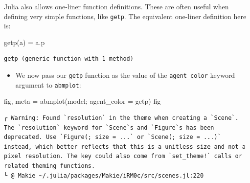 \documentclass[
  letterpaper,
  DIV=11,
  numbers=noendperiod]{scrartcl}
\newenvironment{Shaded}{\begin{snugshade}}{\end{snugshade}}
\newcommand{\FunctionTok}[1]{\textcolor[rgb]{0.28,0.35,0.67}{#1}}
\newcommand{\NormalTok}[1]{\textcolor[rgb]{0.00,0.23,0.31}{#1}}
\newcommand{\OperatorTok}[1]{\textcolor[rgb]{0.37,0.37,0.37}{#1}}
\providecommand{\tightlist}{%
  \setlength{\itemsep}{0pt}\setlength{\parskip}{0pt}}\usepackage{longtable,booktabs,array}
\begin{document}
\begin{tcolorbox}[enhanced jigsaw, breakable, title=\textcolor{quarto-callout-tip-color}{\faLightbulb}\hspace{0.5em}{Tip}, bottomrule=.15mm, coltitle=black, toprule=.15mm, titlerule=0mm, colframe=quarto-callout-tip-color-frame, toptitle=1mm, opacityback=0, colbacktitle=quarto-callout-tip-color!10!white, rightrule=.15mm, bottomtitle=1mm, arc=.35mm, leftrule=.75mm, opacitybacktitle=0.6, colback=white, left=2mm]

Julia also allows one-liner function definitions. These are often useful
when defining very simple functions, like \texttt{getp}. The equivalent
one-liner definition here is:

\begin{Shaded}
\begin{Highlighting}[]
\FunctionTok{getp}\NormalTok{(a) }\OperatorTok{=}\NormalTok{ a.p}
\end{Highlighting}
\end{Shaded}

\begin{verbatim}
getp (generic function with 1 method)
\end{verbatim}

\end{tcolorbox}

\begin{itemize}
\tightlist
\item
  We now pass our \texttt{getp} function as the value of the
  \texttt{agent\_color} keyword argument to \texttt{abmplot}:
\end{itemize}

\begin{Shaded}
\begin{Highlighting}[]
\NormalTok{fig, meta }\OperatorTok{=} \FunctionTok{abmplot}\NormalTok{(model; agent\_color }\OperatorTok{=}\NormalTok{ getp)}
\NormalTok{fig}
\end{Highlighting}
\end{Shaded}

\begin{verbatim}
┌ Warning: Found `resolution` in the theme when creating a `Scene`. The `resolution` keyword for `Scene`s and `Figure`s has been deprecated. Use `Figure(; size = ...` or `Scene(; size = ...)` instead, which better reflects that this is a unitless size and not a pixel resolution. The key could also come from `set_theme!` calls or related theming functions.
└ @ Makie ~/.julia/packages/Makie/iRM0c/src/scenes.jl:220
\end{verbatim}
\end{document}
